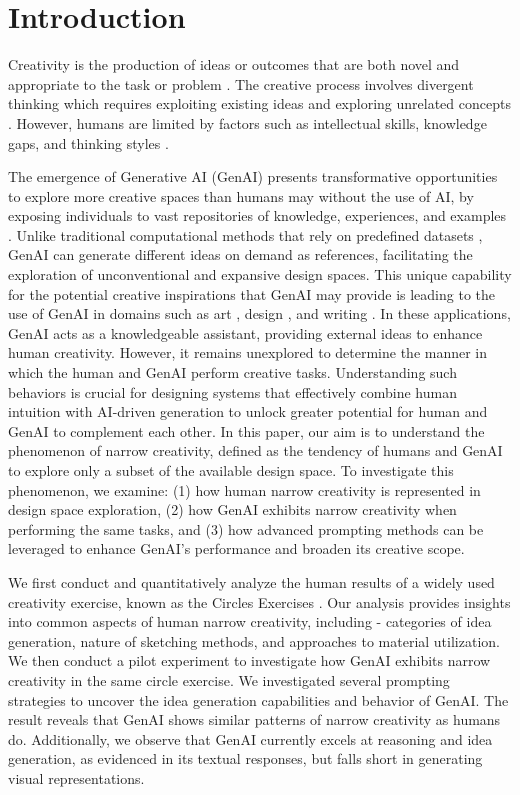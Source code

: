 \section{Introduction}

Creativity is the production of ideas or outcomes that are both novel and appropriate to the task or problem \cite{cropley2023intersection}. The creative process involves divergent thinking which requires exploiting existing ideas and exploring unrelated concepts \cite{jirasek2020big, tromp2024creativity}.
However, humans are limited by factors such as intellectual skills, knowledge gaps, and thinking styles \cite{sternberg2006nature}. 

The emergence of Generative AI (GenAI) presents transformative opportunities to explore more creative spaces than humans may without the use of AI, by exposing individuals to vast repositories of knowledge, experiences, and examples \cite{noy2023experimental}. 
Unlike traditional computational methods that rely on predefined datasets \cite{klemmer2002web,chang2012webcrystal,lee2010designing}, GenAI can generate different ideas on demand as references, facilitating the exploration of unconventional and expansive design spaces. 
This unique capability for the potential creative inspirations that GenAI may provide is leading to the use of GenAI in domains such as art \cite{choi2024creativeconnect}, design \cite{liu20233dall}, and writing \cite{chakrabarty2024art,chakrabarty2024creativity}.
In these applications, GenAI acts as a knowledgeable assistant, providing external ideas to enhance human creativity.
However, it remains unexplored to determine the manner in which the human and GenAI perform creative tasks.
Understanding such behaviors is crucial for designing systems that effectively combine human intuition with AI-driven generation to unlock greater potential for human and GenAI to complement each other.
In this paper, our aim is to understand the phenomenon of narrow creativity, defined as the tendency of humans and GenAI to explore only a subset of the available design space. To investigate this phenomenon, we examine: (1) how human narrow creativity is represented in design space exploration, (2) how GenAI exhibits narrow creativity when performing the same tasks, and (3) how advanced prompting methods can be leveraged to enhance GenAI's performance and broaden its creative scope.

We first conduct and quantitatively analyze the human results of a widely used creativity exercise, known as the Circles Exercises \cite{torrance1966torrance,whalley2020paperclips,xiong2024serious}. 
Our analysis provides insights into common aspects of human narrow creativity, including - categories of idea generation, nature of sketching methods, and approaches to material utilization. 
We then conduct a pilot experiment to investigate how GenAI exhibits narrow creativity in the same circle exercise.
We investigated several prompting strategies to uncover the idea generation capabilities and behavior of GenAI. 
The result reveals that GenAI shows similar patterns of narrow creativity as humans do.
Additionally, we observe that GenAI currently excels at reasoning and idea generation, as evidenced in its textual responses, but falls short in generating visual representations.

